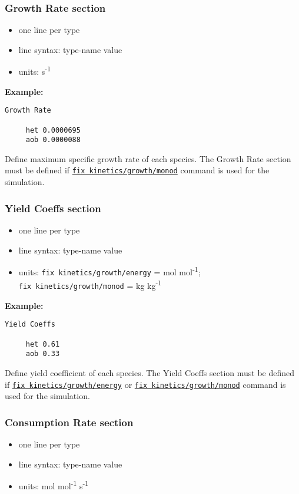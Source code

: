 \documentclass[11pt,a4paper,openright]{article}
\begin{document}
\subsubsection{Growth Rate section}
\label{sgrowth}
\begin{itemize} [nosep]
    \item one line per type
    \item line syntax: type-name {} value 
    \item units: s\textsuperscript{-1}  \\
\end{itemize} 

\textbf{Example:}
\begin{Verbatim}[frame=single]
 Growth Rate

     het 0.0000695
     aob 0.0000088

\end{Verbatim}

Define maximum specific growth rate of each species.  The Growth Rate section must be defined if 
\hyperref[fkineticsmonod]{\tt fix kinetics/growth/monod} command is used for the simulation.


\subsubsection{Yield Coeffs section}
\label{syield}
\begin{itemize} [nosep]
    \item one line per type
    \item line syntax: type-name {} value 
    \item units: {\tt fix kinetics/growth/energy} = mol mol\textsuperscript{-1};\\  {\tt fix kinetics/growth/monod} =  kg kg\textsuperscript{-1}\\
\end{itemize} 

\textbf{Example:}
\begin{Verbatim}[frame=single]
 Yield Coeffs

     het 0.61
     aob 0.33

\end{Verbatim}

Define yield coefficient of each species.  The Yield Coeffs section must be defined if 
\hyperref[fkineticsenergy]{\tt fix kinetics/growth/energy} or \hyperref[fkineticsmonod]{\tt fix kinetics/growth/monod} command is used for the simulation. 

\subsubsection{Consumption Rate section}
\label{sconsum}
\begin{itemize} [nosep]
    \item one line per type
    \item line syntax: type-name {} value 
    \item units: mol mol\textsuperscript{-1} s\textsuperscript{-1}  \\
\end{itemize} 
\end{document}
